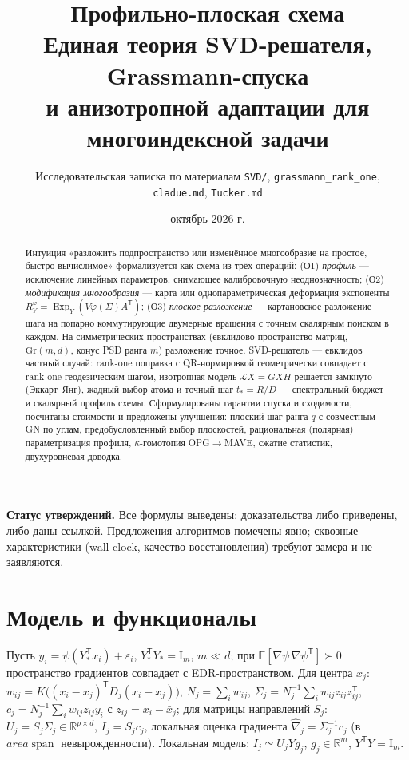 \documentclass[11pt,a4paper]{article}
\title{Профильно-плоская схема\\[3pt]
\large Единая теория SVD-решателя, Grassmann-спуска\\
и анизотропной адаптации для многоиндексной задачи}
\author{Исследовательская записка по материалам \texttt{SVD/},
\texttt{grassmann\_rank\_one}, \texttt{cladue.md}, \texttt{Tucker.md}}
\date{октябрь 2026 г.}
\newcommand{\R}{\mathbb R}
\newcommand{\Id}{\mathrm I}
\newcommand{\T}{^{\mathsf T}}
\newcommand{\Gr}{\mathrm{Gr}}
\newcommand{\Exp}{\operatorname{Exp}}
\DeclareMathOperator{\spanop}{span}
\theoremstyle{remark}
\begin{document}
\maketitle
\vspace{-8mm}
\begin{abstract}
Интуиция «разложить подпространство или изменённое многообразие на простое,
быстро вычислимое» формализуется как схема из трёх операций:
(О1) \emph{профиль} --- исключение линейных параметров, снимающее
калибровочную неоднозначность; (О2) \emph{модификация многообразия} ---
карта или однопараметрическая деформация экспоненты
 $R^\varphi_Y=\Exp_Y(V\varphi(\Sigma)A\T)$;
(О3) \emph{плоское разложение} --- картановское разложение шага на
попарно коммутирующие двумерные вращения с точным скалярным поиском
в каждом. На симметрических пространствах (евклидово пространство матриц,
 $\Gr(m,d)$, конус PSD ранга $m$) разложение точное.
SVD-решатель --- евклидов частный случай: rank-one поправка с
QR-нормировкой геометрически совпадает с rank-one геодезическим шагом,
изотропная модель $\mathcal LX=GXH$ решается замкнуто (Эккарт--Янг),
жадный выбор атома и точный шаг $t_*=R/D$ --- спектральный бюджет и
скалярный профиль схемы. Сформулированы гарантии спуска и сходимости,
посчитаны стоимости и предложены улучшения: плоский шаг ранга $q$ с совместным GN по углам, предобусловленный выбор плоскостей,
рациональная (полярная) параметризация профиля, $\kappa$-гомотопия
OPG$\to$MAVE, сжатие статистик, двухуровневая доводка.
\end{abstract}
\vspace{-3mm}
\tableofcontents
\medskip
\textbf{Статус утверждений.} Все формулы выведены; доказательства либо
приведены, либо даны ссылкой. Предложения алгоритмов помечены явно;
сквозные характеристики (wall-clock, качество восстановления) требуют
замера и не заявляются.

\section{Модель и функционалы}\label{sec:model}

Пусть $y_i=\psi(Y_*\T x_i)+\varepsilon_i$, $Y_*\T Y_*=\Id_m$, $m\ll d$;
при $\mathbb E[\nabla\psi\,\nabla\psi\T]\succ0$ пространство градиентов
совпадает с EDR-пространством. Для центра $x_j$:
 $w_{ij}=K\bigl((x_i-x_j)\T D_j(x_i-x_j)\bigr)$, $N_j=\sum_iw_{ij}$,
 $\Sigma_j=N_j^{-1}\sum_iw_{ij}z_{ij}z_{ij}\T$, $c_j=N_j^{-1}\sum_iw_{ij}z_{ij}y_i$ с $z_{ij}=x_i-\bar x_j$; для матрицы направлений $S_j$:
 $U_j=S_j\Sigma_j\in\R^{p\times d}$, $I_j=S_jc_j$, локальная оценка градиента
 $\hat\nabla_j=\Sigma_j^{-1}c_j$ (в $area{\spanop}$ невырожденности).
Локальная модель: $I_j\simeq U_jYg_j$, $g_j\in\R^m$, $Y\T Y=\Id_m$.
\end{document}
